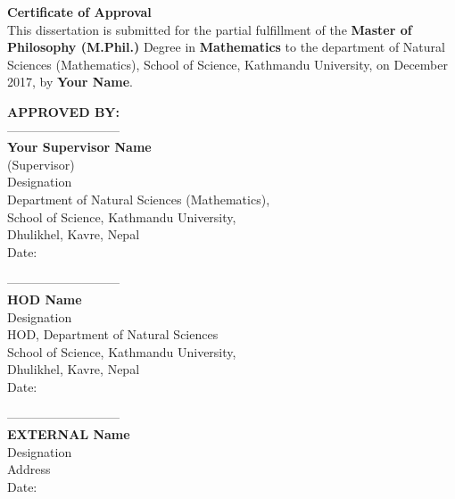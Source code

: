 



{\Large{\bf{Certificate of Approval}}}\\

This dissertation is submitted for the partial fulfillment of the {\bf Master of Philosophy (M.Phil.)} Degree in {\bf Mathematics} to the department of Natural Sciences (Mathematics), School of Science, Kathmandu University, on December 2017, by {\bf Your Name}.\\

\vspace{1cm}

\noindent
{\bf APPROVED BY:}\\

\noindent
---------------------------\\
{\bf Your Supervisor Name}\\
(Supervisor)\\
Designation\\
Department of Natural Sciences (Mathematics),\\
School of Science, Kathmandu University,\\
Dhulikhel, Kavre, Nepal\\
Date:

\vspace{0.5cm}
\noindent
---------------------------\\
{\bf HOD Name}\\
Designation\\
HOD, Department of Natural Sciences\\
School of Science, Kathmandu University,\\
Dhulikhel, Kavre, Nepal\\
Date:

\vspace{0.5cm}
\noindent
---------------------------\\
{\bf EXTERNAL Name}\\
Designation\\
Address\\
Date:   